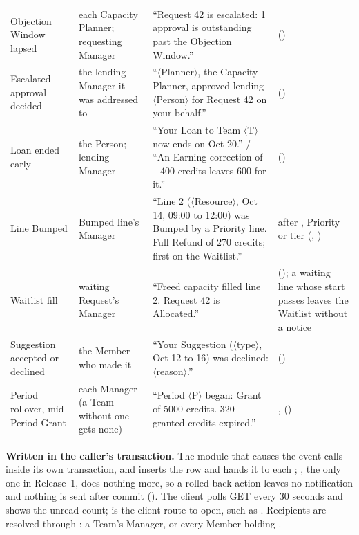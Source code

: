 {\begin{longtable}{@{}L{0.155\textwidth}L{0.145\textwidth}L{0.38\textwidth}L{\tabcolsep\relax}@{}}
Objection Window lapsed & each Capacity Planner; requesting Manager & ``Request 42 is escalated: 1 approval is outstanding past the Objection Window.'' &  () \\
Escalated approval decided & the lending Manager it was addressed to & ``$\langle$Planner$\rangle$, the Capacity Planner, approved lending $\langle$Person$\rangle$ for Request 42 on your behalf.'' &  () \\
Loan ended early & the Person; lending Manager & ``Your Loan to Team $\langle$T$\rangle$ now ends on Oct 20.'' / ``An Earning correction of $-400$ credits leaves 600 for it.'' &  () \\
Line Bumped & Bumped line's Manager & ``Line 2 ($\langle$Resource$\rangle$, Oct 14, 09:00 to 12:00) was Bumped by a Priority line. Full Refund of 270 credits; first on the Waitlist.'' & after , Priority or tier (, ) \\
Waitlist fill & waiting Request's Manager & ``Freed capacity filled line 2. Request 42 is Allocated.'' &  (); a waiting line whose start passes leaves the Waitlist without a notice \\
Suggestion accepted or declined & the Member who made it & ``Your Suggestion ($\langle$type$\rangle$, Oct 12 to 16) was declined: $\langle$reason$\rangle$.'' &  () \\
Period rollover, mid-Period Grant & each Manager (a Team without one gets none) & ``Period $\langle$P$\rangle$ began: Grant of 5000 credits. 320 granted credits expired.'' & ,  () \\
\end{longtable}
}

\textbf{Written in the caller's transaction.} The module that causes the event calls  inside its own transaction, and  inserts the row and hands it to each ; , the only one in Release~1, does nothing more, so a rolled-back action leaves no notification and nothing is sent after commit (). The client polls GET  every 30 seconds and shows the unread count;  is the client route to open, such as . Recipients are resolved through : a Team's Manager, or every Member holding .

